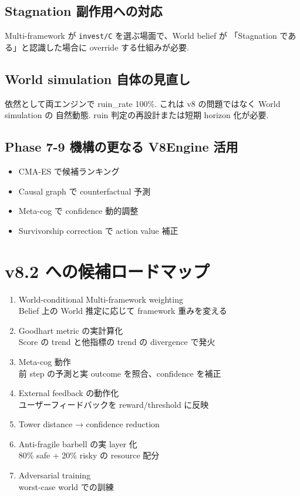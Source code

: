 \documentclass[a4paper,11pt]{report}
\begin{document}
\subsection{Stagnation 副作用への対応}

Multi-framework が \texttt{invest/C} を選ぶ場面で、World belief が
「Stagnation である」と認識した場合に override する仕組みが必要.

\subsection{World simulation 自体の見直し}

依然として両エンジンで ruin\_rate 100\%. これは v8 の問題ではなく World simulation の
自然動態. ruin 判定の再設計または短期 horizon 化が必要.

\subsection{Phase 7-9 機構の更なる V8Engine 活用}

\begin{itemize}[leftmargin=*]
  \item CMA-ES で候補ランキング
  \item Causal graph で counterfactual 予測
  \item Meta-cog で confidence 動的調整
  \item Survivorship correction で action value 補正
\end{itemize}

\section{v8.2 への候補ロードマップ}

\begin{enumerate}[leftmargin=*]
  \item World-conditional Multi-framework weighting\\
        Belief 上の World 推定に応じて framework 重みを変える
  \item Goodhart metric の実計算化\\
        Score の trend と他指標の trend の divergence で発火
  \item Meta-cog 動作\\
        前 step の予測と実 outcome を照合、confidence を補正
  \item External feedback の動作化\\
        ユーザーフィードバックを reward/threshold に反映
  \item Tower distance → confidence reduction
  \item Anti-fragile barbell の実 layer 化\\
        80\% safe + 20\% risky の resource 配分
  \item Adversarial training\\
        worst-case world での訓練
\end{enumerate}
\end{document}

